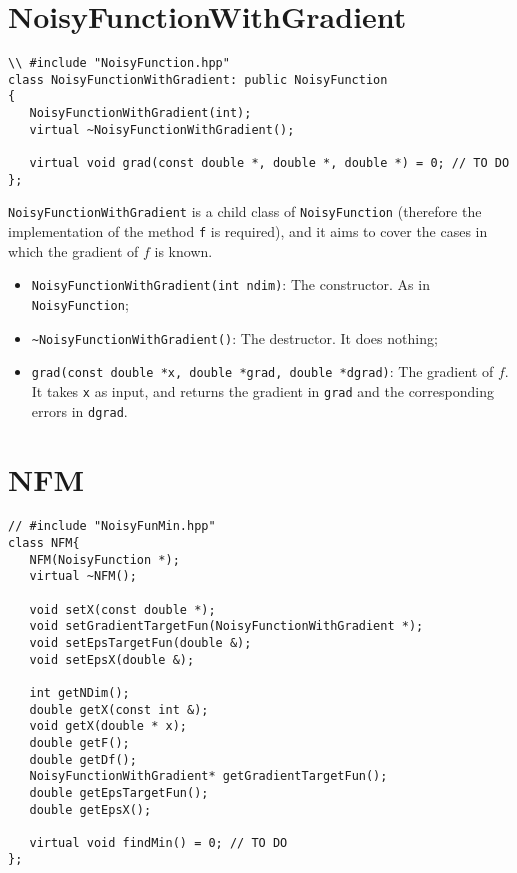\documentclass[11pt,a4paper,twoside]{article}
\begin{document}



\section{NoisyFunctionWithGradient} %
\label{sec:NoisyFunctionWithGradient}

\begin{lstlisting}
\\ #include "NoisyFunction.hpp"
class NoisyFunctionWithGradient: public NoisyFunction
{
   NoisyFunctionWithGradient(int);
   virtual ~NoisyFunctionWithGradient();
   
   virtual void grad(const double *, double *, double *) = 0; // TO DO
};
\end{lstlisting}

\verb+NoisyFunctionWithGradient+ is a child class of \verb+NoisyFunction+ (therefore the implementation of the method \verb+f+ is required), and it aims to cover the cases in which the gradient of $f$ is known.

\begin{itemize}
   \item \verb+NoisyFunctionWithGradient(int ndim)+: The constructor. As in \verb+NoisyFunction+;
   \item \verb+~NoisyFunctionWithGradient()+: The destructor. It does nothing;
   \item \verb+grad(const double *x, double *grad, double *dgrad)+: The gradient of $f$. It takes \verb+x+ as input, and returns the gradient in \verb+grad+ and the corresponding errors in \verb+dgrad+.
\end{itemize}




\section{NFM} %
\label{sec:nfm}

\begin{lstlisting}
// #include "NoisyFunMin.hpp"
class NFM{
   NFM(NoisyFunction *);                                       
   virtual ~NFM();
   
   void setX(const double *);
   void setGradientTargetFun(NoisyFunctionWithGradient *);          
   void setEpsTargetFun(double &); 
   void setEpsX(double &);                          
   
   int getNDim();                                         
   double getX(const int &);                    
   void getX(double * x);
   double getF();                             
   double getDf();                  
   NoisyFunctionWithGradient* getGradientTargetFun(); 
   double getEpsTargetFun();            
   double getEpsX();
   
   virtual void findMin() = 0; // TO DO
};
  
\end{lstlisting}
\end{document}
